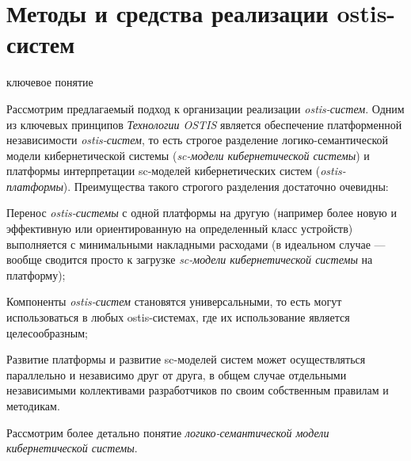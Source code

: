 \section{Методы и средства реализации ostis-систем}
\label{sec_interpreter_ostis_impl}

\begin{SCn}
\begin{scnrelfromlist}{ключевое понятие}
\end{scnrelfromlist}
\end{SCn}

Рассмотрим предлагаемый подход к организации реализации \textit{ostis-систем}. Одним из ключевых принципов \textit{Технологии OSTIS} является обеспечение платформенной независимости \textit{ostis-систем}, то есть строгое разделение логико-семантической модели кибернетической системы (\textit{sc-модели кибернетической системы}) и платформы интерпретации sc-моделей кибернетических систем (\textit{ostis-платформы}). Преимущества такого строгого разделения достаточно очевидны:
\begin{textitemize}
	\item Перенос \textit{ostis-системы} с одной платформы на другую (например более новую и эффективную или ориентированную на определенный класс устройств) выполняется с минимальными накладными расходами (в идеальном случае --- вообще сводится просто к загрузке \textit{sc-модели кибернетической системы} на платформу);
	\item Компоненты \textit{ostis-систем} становятся универсальными, то есть могут использоваться в любых ostis-системах, где их использование является целесообразным;
	\item Развитие платформы и развитие sc-моделей систем может осуществляться параллельно и независимо друг от друга, в общем случае отдельными независимыми коллективами разработчиков по своим собственным правилам и методикам.
\end{textitemize}

Рассмотрим более детально понятие \textit{логико-семантической модели кибернетической системы}.

